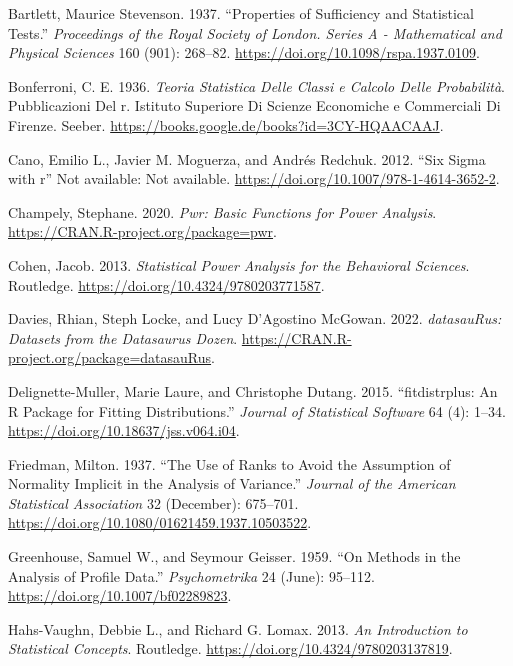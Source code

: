 \documentclass[
  a4paper,
]{scrbook}
\newlength{\cslhangindent}
\newenvironment{CSLReferences}[2] %
 {\begin{list}{}{%
  \setlength{\itemindent}{0pt}
  \setlength{\leftmargin}{0pt}
  \setlength{\parsep}{0pt}
  \ifodd #1
   \setlength{\leftmargin}{\cslhangindent}
   \setlength{\itemindent}{-1\cslhangindent}
  \fi
  \setlength{\itemsep}{#2\baselineskip}}}
 {\end{list}}
\begin{document}
\label{refs}
\begin{CSLReferences}{1}{0}
Bartlett, Maurice Stevenson. 1937. {``Properties of Sufficiency and
Statistical Tests.''} \emph{Proceedings of the Royal Society of London.
Series A - Mathematical and Physical Sciences} 160 (901): 268--82.
\url{https://doi.org/10.1098/rspa.1937.0109}.

Bonferroni, C. E. 1936. \emph{Teoria Statistica Delle Classi e Calcolo
Delle Probabilit{à}}. Pubblicazioni Del r. Istituto Superiore Di Scienze
Economiche e Commerciali Di Firenze. Seeber.
\url{https://books.google.de/books?id=3CY-HQAACAAJ}.

Cano, Emilio L., Javier M. Moguerza, and Andrés Redchuk. 2012. {``Six
Sigma with r''} Not available: Not available.
\url{https://doi.org/10.1007/978-1-4614-3652-2}.

Champely, Stephane. 2020. \emph{Pwr: Basic Functions for Power
Analysis}. \url{https://CRAN.R-project.org/package=pwr}.

Cohen, Jacob. 2013. \emph{Statistical Power Analysis for the Behavioral
Sciences}. Routledge. \url{https://doi.org/10.4324/9780203771587}.

Davies, Rhian, Steph Locke, and Lucy D'Agostino McGowan. 2022.
\emph{datasauRus: Datasets from the Datasaurus Dozen}.
\url{https://CRAN.R-project.org/package=datasauRus}.

Delignette-Muller, Marie Laure, and Christophe Dutang. 2015.
{``{fitdistrplus}: An {R} Package for Fitting Distributions.''}
\emph{Journal of Statistical Software} 64 (4): 1--34.
\url{https://doi.org/10.18637/jss.v064.i04}.

Friedman, Milton. 1937. {``The Use of Ranks to Avoid the Assumption of
Normality Implicit in the Analysis of Variance.''} \emph{Journal of the
American Statistical Association} 32 (December): 675--701.
\url{https://doi.org/10.1080/01621459.1937.10503522}.

Greenhouse, Samuel W., and Seymour Geisser. 1959. {``On Methods in the
Analysis of Profile Data.''} \emph{Psychometrika} 24 (June): 95--112.
\url{https://doi.org/10.1007/bf02289823}.

Hahs-Vaughn, Debbie L., and Richard G. Lomax. 2013. \emph{An
Introduction to Statistical Concepts}. Routledge.
\url{https://doi.org/10.4324/9780203137819}.


\end{CSLReferences}
\end{document}
